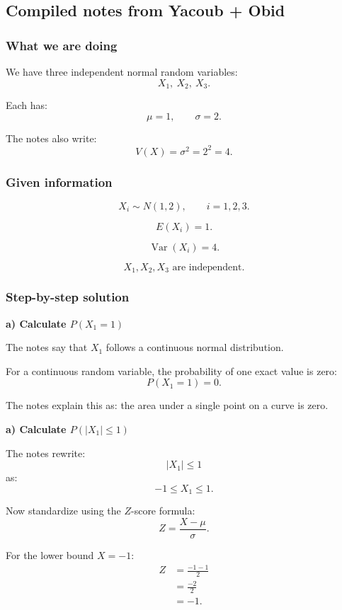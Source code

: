 \documentclass[10pt]{article}
\begin{document}
\subsection*{Compiled notes from Yacoub + Obid}

\subsubsection*{What we are doing}

We have three independent normal random variables:
\[
X_1,\ X_2,\ X_3.
\]

Each has:
\[
\mu=1,
\qquad
\sigma=2.
\]

The notes also write:
\[
V(X)=\sigma^2=2^2=4.
\]

\subsubsection*{Given information}

\[
X_i\sim N(1,2),
\qquad
i=1,2,3.
\]

\[
E(X_i)=1.
\]

\[
\operatorname{Var}(X_i)=4.
\]

\[
X_1,X_2,X_3
\text{ are independent.}
\]

\subsubsection*{Step-by-step solution}

\textbf{a) Calculate \(P(X_1=1)\)}

The notes say that \(X_1\) follows a continuous
normal distribution.

For a continuous random variable, the probability of
one exact value is zero:
\[
P(X_1=1)=0.
\]

The notes explain this as:
the area under a single point on a curve is zero.

\textbf{a) Calculate \(P(|X_1|\le 1)\)}

The notes rewrite:
\[
|X_1|\le 1
\]
as:
\[
-1\le X_1\le 1.
\]

Now standardize using the \(Z\)-score formula:
\[
Z=\frac{X-\mu}{\sigma}.
\]

For the lower bound \(X=-1\):
\begin{align*}
Z
&=
\frac{-1-1}{2}
\\[2mm]
&=
\frac{-2}{2}
\\[2mm]
&=-1.
\end{align*}
\end{document}
